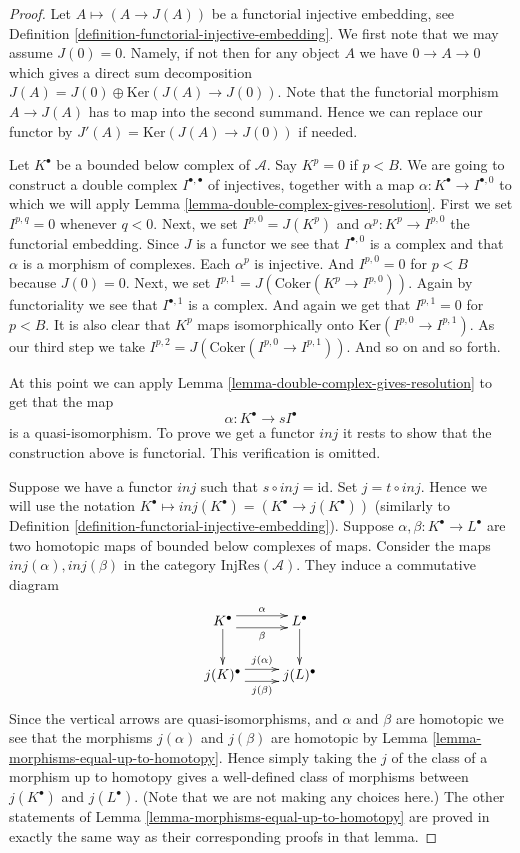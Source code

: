 \begin{proof}
Let $A \mapsto (A \to J(A))$ be a functorial injective embedding,
see Definition \ref{definition-functorial-injective-embedding}.
We first note that we may assume $J(0) = 0$. Namely, if not then
for any object $A$ we have $0 \to A \to 0$ which gives
a direct sum decomposition $J(A) = J(0) \oplus \text{Ker}(J(A) \to J(0))$.
Note that the functorial morphism $A \to J(A)$ has to map
into the second summand. Hence we can replace our functor
by $J'(A) = \text{Ker}(J(A) \to J(0))$ if needed.

\medskip\noindent
Let $K^\bullet$ be a bounded below complex of $\mathcal{A}$.
Say $K^p = 0$ if $p < B$.
We are going to construct a double complex $I^{\bullet, \bullet}$
of injectives, together with a map $\alpha : K^\bullet \to I^{\bullet, 0}$
to which we will apply Lemma \ref{lemma-double-complex-gives-resolution}.
First we set $I^{p, q} = 0$ whenever $q < 0$.
Next, we set $I^{p, 0} = J(K^p)$ and $\alpha^p : K^p \to I^{p, 0}$
the functorial embedding. Since $J$ is a functor we see that
$I^{\bullet, 0}$ is a complex and that $\alpha$ is a
morphism of complexes. Each $\alpha^p$ is injective. And
$I^{p, 0} = 0$ for $p < B$ because $J(0) = 0$. Next, we set
$I^{p, 1} = J(\text{Coker}(K^p \to I^{p, 0}))$. Again by functoriality
we see that $I^{\bullet, 1}$ is a complex. And again we get
that $I^{p, 1} = 0$ for $p < B$. It is also clear that
$K^p$ maps isomorphically onto $\text{Ker}(I^{p, 0} \to I^{p, 1})$.
As our third step we take $I^{p, 2} = J(\text{Coker}(I^{p, 0} \to I^{p, 1}))$.
And so on and so forth.

\medskip\noindent
At this point we can apply Lemma \ref{lemma-double-complex-gives-resolution}
to get that the map
$$
\alpha : K^\bullet \to sI^\bullet
$$
is a quasi-isomorphism. To prove we get a functor $inj$ it
rests to show that the construction above
is functorial. This verification is omitted.

\medskip\noindent
Suppose we have a functor $inj$ such that $s \circ inj = \text{id}$.
Set $j = t \circ inj$. Hence we will use the notation
$K^\bullet \mapsto inj(K^\bullet) = (K^\bullet \to j(K^\bullet))$
(similarly to
Definition \ref{definition-functorial-injective-embedding}).
Suppose $\alpha , \beta : K^\bullet \to L^\bullet$ are two homotopic
maps of bounded below complexes of maps. Consider the maps
$inj(\alpha), inj(\beta)$ in the category $\text{InjRes}(\mathcal{A})$.
They induce a commutative diagram
$$
\xymatrix{
K^\bullet
\ar@<1ex>[r]^-{\alpha} \ar@<-1ex>[r]_-{\beta}
\ar[d] &
L^\bullet \ar[d] \\
j(K)^\bullet
\ar@<1ex>[r]^-{j(\alpha)} \ar@<-1ex>[r]_-{j(\beta)}
&
j(L)^\bullet
}
$$
Since the vertical arrows are quasi-isomorphisms, and $\alpha$ and $\beta$
are homotopic we see that
the morphisms $j(\alpha)$ and $j(\beta)$ are homotopic
by Lemma \ref{lemma-morphisms-equal-up-to-homotopy}. Hence
simply taking the $j$ of the class of a morphism up to
homotopy gives a well-defined class of morphisms between
$j(K^\bullet)$ and $j(L^\bullet)$. (Note that we are not
making any choices here.) The other statements of
Lemma \ref{lemma-morphisms-equal-up-to-homotopy}
are proved in exactly the same way as their corresponding proofs
in that lemma.
\end{proof}


